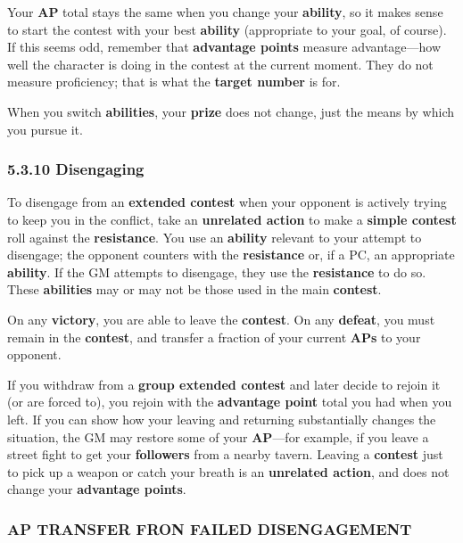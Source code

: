 \documentclass[
]{article}
\begin{document}
Your \textbf{AP} total stays the same when you change your
\textbf{ability}, so it makes sense to start the contest with your best
\textbf{ability} (appropriate to your goal, of course). If this seems
odd, remember that \textbf{advantage points} measure advantage---how
well the character is doing in the contest at the current moment. They
do not measure proficiency; that is what the \textbf{target number} is
for.

When you switch \textbf{abilities}, your \textbf{prize} does not change,
just the means by which you pursue it.

\hypertarget{disengaging-1}{%
\subsubsection{5.3.10 Disengaging}\label{disengaging-1}}

To disengage from an \textbf{extended contest} when your opponent is
actively trying to keep you in the conflict, take an \textbf{unrelated
action} to make a \textbf{simple contest} roll against the
\textbf{resistance}. You use an \textbf{ability} relevant to your
attempt to disengage; the opponent counters with the \textbf{resistance}
or, if a PC, an appropriate \textbf{ability}. If the GM attempts to
disengage, they use the \textbf{resistance} to do so. These
\textbf{abilities} may or may not be those used in the main
\textbf{contest}.

On any \textbf{victory}, you are able to leave the \textbf{contest}. On
any \textbf{defeat}, you must remain in the \textbf{contest}, and
transfer a fraction of your current \textbf{APs} to your opponent.

If you withdraw from a \textbf{group extended contest} and later decide
to rejoin it (or are forced to), you rejoin with the \textbf{advantage
point} total you had when you left. If you can show how your leaving and
returning substantially changes the situation, the GM may restore some
of your \textbf{AP}---for example, if you leave a street fight to get
your \textbf{followers} from a nearby tavern. Leaving a \textbf{contest}
just to pick up a weapon or catch your breath is an \textbf{unrelated
action}, and does not change your \textbf{advantage points}.

\hypertarget{ap-transfer-fron-failed-disengagement}{%
\subsubsection{AP TRANSFER FRON FAILED
DISENGAGEMENT}\label{ap-transfer-fron-failed-disengagement}}
\end{document}
